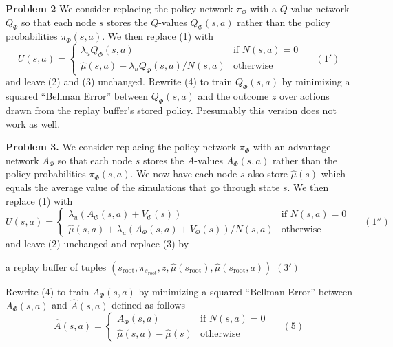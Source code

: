 \documentclass{article}
\newcommand{\solution}[1]{\bigskip {\color{red} {\bf Solution}: #1}}
\begin{document}
\bigskip
{\bf Problem 2}
We consider replacing the policy network $\pi_\Phi$ with a $Q$-value network $Q_\Phi$ so that each node $s$ stores the $Q$-values $Q_\Phi(s,a)$ rather than
the policy probabilities $\pi_\Phi(s,a)$.  We then replace (1) with
$$U(s,a) =  \left\{\begin{array}{ll}\lambda_u Q_\Phi(s,a) &\mbox{if $N(s,a) = 0$} \\ \hat{\mu}(s,a) + \lambda_u Q_\Phi(s,a)/N(s,a) & \mbox{otherwise} \end{array}\right.\;\;\;\;\;(1')$$
and leave (2) and (3) unchanged.  Rewrite (4) to train $Q_\Phi(s,a)$ by minimizing a squared ``Bellman Error'' between $Q_\Phi(s,a)$ and the outcome $z$ over actions drawn from the replay buffer's stored policy.
Presumably this version does not work as well.

\solution{
  
  $$\Phi^*\; = \;\argmin_\Phi \;E_{(s,\pi,z) \sim \mathrm{Replay},\;a \sim \pi}\;
  \left(\begin{array}{l} (V_\Phi(s) - z)^2 \\ \\ - \lambda_1(Q(s,a) - z)^2 \\ \\ + \lambda_2||\Phi||^2\end{array}\right)$$
}

\bigskip
{\bf Problem 3.}
We consider replacing the policy network $\pi_\Phi$ with an advantage network $A_\Phi$ so that each node $s$ stores the $A$-values $A_\Phi(s,a)$ rather than
the policy probabilities $\pi_\Phi(s,a)$.  We now have each node $s$ also store $\hat{\mu}(s)$ which equals the average value of the simulations that go through state $s$.
We then replace (1) with
$$U(s,a) =  \left\{\begin{array}{ll}\lambda_u(A_\Phi(s,a) + V_\Phi(s)) &\mbox{if $N(s,a) = 0$} \\ \hat{\mu}(s,a) + \lambda_u(A_\Phi(s,a) + V_\Phi(s))/N(s,a) & \mbox{otherwise} \end{array}\right.\;\;\;\;\;(1'')$$
and leave (2) unchanged and replace (3) by

\medskip
\centerline{a replay buffer of tuples $(s_{\mathrm{root}},\pi_{s_{\mathrm{root}}},z,\hat{\mu}(s_{\mathrm{root}}),\hat{\mu}(s_{\mathrm{root}},a))$ \hspace{2em}$(3')$}

\medskip
Rewrite (4) to train $A_\Phi(s,a)$ by minimizing a squared ``Bellman Error'' between $A_\Phi(s,a)$ and $\hat{A}(s,a)$ defined as follows
$$\hat{A}(s,a) =  \left\{\begin{array}{ll}A_\Phi(s,a) &\mbox{if $N(s,a) = 0$} \\ \hat{\mu}(s,a) - \hat{\mu}(s) & \mbox{otherwise} \end{array}\right.\;\;\;\;\;(5)$$
\end{document}
